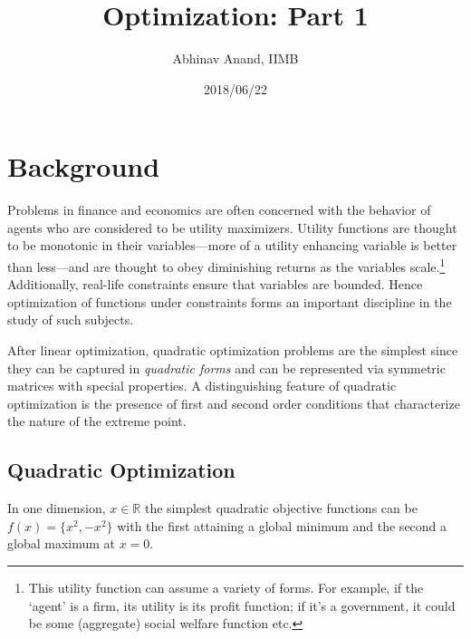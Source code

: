\documentclass[11pt,]{article}
\title{Optimization: Part 1}
\author{Abhinav Anand, IIMB}
\date{2018/06/22}
\let\rmarkdownfootnote\footnote%
\def\footnote{\protect\rmarkdownfootnote}
\begin{document}
\maketitle

\section{Background}\label{background}

Problems in finance and economics are often concerned with the behavior
of agents who are considered to be utility maximizers. Utility functions
are thought to be monotonic in their variables---more of a utility
enhancing variable is better than less---and are thought to obey
diminishing returns as the variables scale.\footnote{This utility
  function can assume a variety of forms. For example, if the `agent' is
  a firm, its utility is its profit function; if it's a government, it
  could be some (aggregate) social welfare function etc.} Additionally,
real-life constraints ensure that variables are bounded. Hence
optimization of functions under constraints forms an important
discipline in the study of such subjects.

After linear optimization, quadratic optimization problems are the
simplest since they can be captured in \emph{quadratic forms} and can be
represented via symmetric matrices with special properties. A
distinguishing feature of quadratic optimization is the presence of
first and second order conditions that characterize the nature of the
extreme point.

\subsection{Quadratic Optimization}\label{quadratic-optimization}

In one dimension, \(x\in \mathbb{R}\) the simplest quadratic objective
functions can be \(f(x)=\{x^2, -x^2\}\) with the first attaining a
global minimum and the second a global maximum at \(x=0\).
\end{document}
